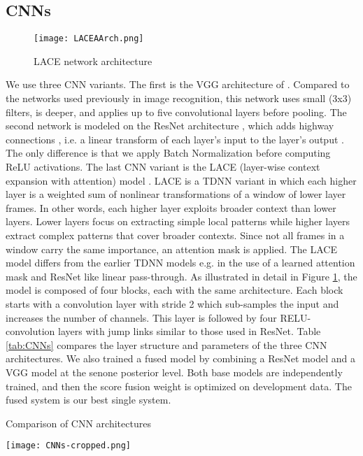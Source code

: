 \documentclass{article}
\begin{document}
\subsection{CNNs}
\begin{figure}[t]
\centering
\texttt{[image: LACEAArch.png]}
\caption{LACE network architecture}
\label{fig:LACE}
\end{figure}
We use three CNN variants. The first is the VGG architecture of \cite{Simonyan2014very}. Compared to the networks used previously in image recognition, this 
network uses small (3x3) filters, is deeper, and applies up to 
five convolutional layers before pooling. 
The second network is modeled on the ResNet architecture \cite{he2015deep}, 
which adds highway connections \cite{DBLP:journals/corr/SrivastavaGS15}, i.e. a linear transform of each layer's input to the layer's output
\cite{DBLP:journals/corr/SrivastavaGS15,ghahremani2016linearly}. The only difference is that we apply Batch Normalization before computing ReLU activations.
The last CNN variant is the LACE (layer-wise context expansion with attention) model \cite{yu2016deep}. LACE is a TDNN \cite{waibel1989phoneme} variant in which each higher layer is a weighted sum of nonlinear transformations of a window of lower layer frames. In other words, each higher layer exploits broader context than lower layers. Lower layers focus on extracting simple local patterns while higher layers extract complex patterns that cover broader contexts.
Since not all frames in a window carry the same importance, an attention mask is applied.
The LACE model differs from the earlier TDNN models e.g. \cite{waibel1989phoneme,waibel1989consonant} in the use of a learned attention mask and ResNet like
linear pass-through. As illustrated in detail in Figure \ref{fig:LACE}, the model is composed of four blocks, each with the same architecture. Each block starts with a convolution layer with stride 2 which sub-samples the input and increases the number of channels. This layer is followed by four RELU-convolution layers with jump links similar to those used in ResNet. 
Table \ref{tab:CNNs} compares the layer structure and parameters of the three CNN architectures. 
We also trained a fused model by combining a ResNet model and a VGG model at 
the senone posterior level. Both base models are independently trained, and then the score fusion weight is optimized on development data. 
The fused system is our best single system. 
\begin{table}[t]
\centering
\caption{Comparison of CNN architectures}
\vspace*{0.1in}
\label{tab:CNNs}
\texttt{[image: CNNs-cropped.png]}
\end{table}
\end{document}
